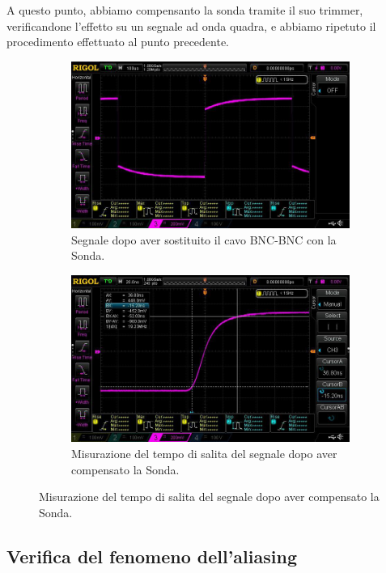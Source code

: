 \documentclass[a4paper]{article}
\begin{document}
				\newpage
				A questo punto, abbiamo compensanto la sonda tramite il suo trimmer, verificandone l'effetto su un segnale ad onda quadra, e abbiamo ripetuto il procedimento effettuato al punto precedente.
				\begin{figure}[h!]
					\centering
					\begin{subfigure}{0.4\textwidth}
						\centering
						\includegraphics[scale=0.2]{tempoSalitaSondaNonCompensata}
						\caption{Segnale dopo aver sostituito il cavo BNC-BNC con la Sonda.}
					\end{subfigure}
					\begin{subfigure}{0.4\textwidth}
						\centering
						\includegraphics[scale=0.2]{tempoSalitaSondaCompensata}
						\caption{Misurazione del tempo di salita del segnale dopo aver compensato la Sonda.}
					\end{subfigure}
					\label{fig:tempoSalitaSonda}
				\end{figure}
		\subsection{Verifica del fenomeno dell’aliasing}
\end{document}
